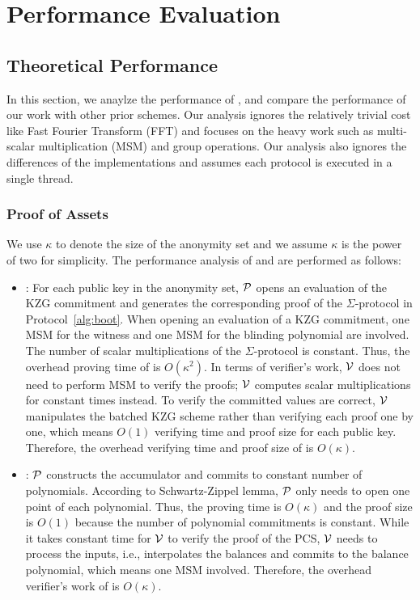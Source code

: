 \chapter{Performance Evaluation}

\section{Theoretical Performance}

In this section, we anaylze the performance of \Sys, and compare the performance of our work with other prior schemes. Our analysis ignores the relatively trivial cost like Fast Fourier Transform (FFT) and focuses on the heavy work such as multi-scalar multiplication (MSM) and group operations. Our analysis also ignores the differences of the implementations and assumes each protocol is executed in a single thread.
\subsection{Proof of Assets}

We use $\kappa$ to denote the size of the anonymity set and we assume $\kappa$ is the power of two for simplicity. The performance analysis of \bootstrap and \userproof are performed as follows:
\begin{itemize}

\item \bootstrap: For each public key in the anonymity set, $\mathcal{P}$ opens an evaluation of the KZG commitment and generates the corresponding proof of the $\Sigma$-protocol in Protocol~\ref{alg:boot}. When opening an evaluation of a KZG commitment, one MSM for the witness and one MSM for the blinding polynomial are involved. The number of scalar multiplications of the $\Sigma$-protocol is constant. Thus, the overhead proving time of \bootstrap is $O(\kappa^2)$. In terms of verifier's work, $\mathcal{V}$ does not need to perform MSM to verify the proofs; $\mathcal{V}$ computes scalar multiplications for constant times instead. To verify the committed values are correct, $\mathcal{V}$ manipulates the batched KZG scheme rather than verifying each proof one by one, which means $O(1)$ verifying time and proof size for each public key. Therefore, the overhead verifying time and proof size of \bootstrap is $O(\kappa)$.

\item \poa: $\mathcal{P}$ constructs the accumulator and commits to constant number of polynomials. According to Schwartz-Zippel lemma, $\mathcal{P}$ only needs to open one point of each polynomial. Thus, the proving time is $O(\kappa)$ and the proof size is $O(1)$ because the number of polynomial commitments is constant. While it takes constant time for $\mathcal{V}$ to verify the proof of the PCS, $\mathcal{V}$ needs to process the inputs, i.e., interpolates the balances and commits to the balance polynomial, which means one MSM involved. Therefore, the overhead verifier's work of \poa is $O(\kappa)$.

\end{itemize}

